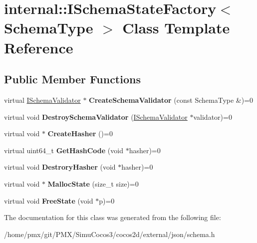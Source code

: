 \hypertarget{classinternal_1_1ISchemaStateFactory}{}\section{internal\+:\+:I\+Schema\+State\+Factory$<$ Schema\+Type $>$ Class Template Reference}
\label{classinternal_1_1ISchemaStateFactory}
\subsection*{Public Member Functions}
\begin{DoxyCompactItemize}
\item 
\mbox{\label{classinternal_1_1ISchemaStateFactory_ae8c98fcff6a057b4fcd9018fc14551a8}} 
virtual \hyperlink{classinternal_1_1ISchemaValidator}{I\+Schema\+Validator} $\ast$ {\bfseries Create\+Schema\+Validator} (const Schema\+Type \&)=0
\item 
\mbox{\label{classinternal_1_1ISchemaStateFactory_a112cbf154077050bc30ffe670032442c}} 
virtual void {\bfseries Destroy\+Schema\+Validator} (\hyperlink{classinternal_1_1ISchemaValidator}{I\+Schema\+Validator} $\ast$validator)=0
\item 
\mbox{\label{classinternal_1_1ISchemaStateFactory_a4ac37b9d3e9526004c82692473f978f4}} 
virtual void $\ast$ {\bfseries Create\+Hasher} ()=0
\item 
\mbox{\label{classinternal_1_1ISchemaStateFactory_addfcf00963cc777edf642b204f07c8d6}} 
virtual uint64\+\_\+t {\bfseries Get\+Hash\+Code} (void $\ast$hasher)=0
\item 
\mbox{\label{classinternal_1_1ISchemaStateFactory_a70b8d88180d2e6993105b17f19101635}} 
virtual void {\bfseries Destrory\+Hasher} (void $\ast$hasher)=0
\item 
\mbox{\label{classinternal_1_1ISchemaStateFactory_ada92ebf8e9ef994f7e20a0f7f9750519}} 
virtual void $\ast$ {\bfseries Malloc\+State} (size\+\_\+t size)=0
\item 
\mbox{\label{classinternal_1_1ISchemaStateFactory_a27bd2138940cac3c330dd8399c49b22b}} 
virtual void {\bfseries Free\+State} (void $\ast$p)=0
\end{DoxyCompactItemize}


The documentation for this class was generated from the following file\+:\begin{DoxyCompactItemize}
\item 
/home/pmx/git/\+P\+M\+X/\+Simu\+Cocos3/cocos2d/external/json/schema.\+h\end{DoxyCompactItemize}
